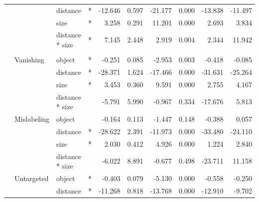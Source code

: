 \begin{longtable}[t]{llllrrrrrr}
\cmidrule{3-10}\nopagebreak
\hspace{1em} &  & distance & * & -12.646 & 0.597 & -21.177 & 0.000 & -13.838 & -11.497\\
\cmidrule{3-10}\nopagebreak
\hspace{1em} &  & size & * & 3.258 & 0.291 & 11.201 & 0.000 & 2.693 & 3.834\\
\cmidrule{3-10}\nopagebreak
\hspace{1em} &  & distance * size & * & 7.145 & 2.448 & 2.919 & 0.004 & 2.344 & 11.942\\
\cmidrule{1-10}\pagebreak[0]
\addlinespace[0.3em]
\multicolumn{10}{l}{\textbf{RetinaNet}}\\
\hspace{1em} & Vanishing & object & * & -0.251 & 0.085 & -2.953 & 0.003 & -0.418 & -0.085\\
\cmidrule{3-10}\nopagebreak
\hspace{1em} &  & distance & * & -28.371 & 1.624 & -17.466 & 0.000 & -31.631 & -25.264\\
\cmidrule{3-10}\nopagebreak
\hspace{1em} &  & size & * & 3.453 & 0.360 & 9.591 & 0.000 & 2.755 & 4.167\\
\cmidrule{3-10}\nopagebreak
\hspace{1em} &  & distance * size &  & -5.791 & 5.990 & -0.967 & 0.334 & -17.676 & 5.813\\
\cmidrule{2-10}\nopagebreak
\hspace{1em} & Mislabeling & object &  & -0.164 & 0.113 & -1.447 & 0.148 & -0.388 & 0.057\\
\cmidrule{3-10}\nopagebreak
\hspace{1em} &  & distance & * & -28.622 & 2.391 & -11.973 & 0.000 & -33.480 & -24.110\\
\cmidrule{3-10}\nopagebreak
\hspace{1em} &  & size & * & 2.030 & 0.412 & 4.926 & 0.000 & 1.224 & 2.840\\
\cmidrule{3-10}\nopagebreak
\hspace{1em} &  & distance * size &  & -6.022 & 8.891 & -0.677 & 0.498 & -23.711 & 11.158\\
\cmidrule{2-10}\nopagebreak
\hspace{1em} & Untargeted & object & * & -0.403 & 0.079 & -5.130 & 0.000 & -0.558 & -0.250\\
\cmidrule{3-10}\nopagebreak
\hspace{1em} &  & distance & * & -11.268 & 0.818 & -13.768 & 0.000 & -12.910 & -9.702\\

\end{longtable}
